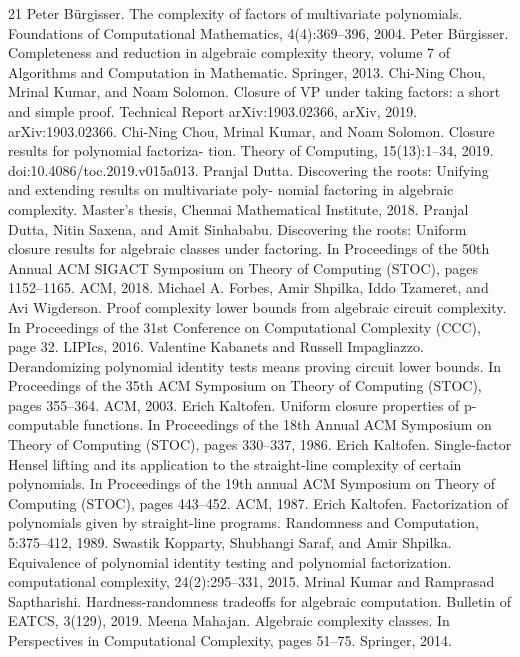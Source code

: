 \begin{thebibliography}{21}
Peter Bürgisser. The complexity of factors of multivariate polynomials. Foundations of Computational Mathematics, 4(4):369–396, 2004.
Peter Bürgisser. Completeness and reduction in algebraic complexity theory, volume 7 of Algorithms and Computation in Mathematic. Springer, 2013.
Chi-Ning Chou, Mrinal Kumar, and Noam Solomon. Closure of VP under taking factors: a short and simple proof. Technical Report arXiv:1903.02366, arXiv, 2019. arXiv:1903.02366.
Chi-Ning Chou, Mrinal Kumar, and Noam Solomon. Closure results for polynomial factoriza- tion. Theory of Computing, 15(13):1–34, 2019. doi:10.4086/toc.2019.v015a013.
Pranjal Dutta. Discovering the roots: Unifying and extending results on multivariate poly- nomial factoring in algebraic complexity. Master’s thesis, Chennai Mathematical Institute, 2018.
Pranjal Dutta, Nitin Saxena, and Amit Sinhababu. Discovering the roots: Uniform closure results for algebraic classes under factoring. In Proceedings of the 50th Annual ACM SIGACT Symposium on Theory of Computing (STOC), pages 1152–1165. ACM, 2018.
Michael A. Forbes, Amir Shpilka, Iddo Tzameret, and Avi Wigderson. Proof complexity lower bounds from algebraic circuit complexity. In Proceedings of the 31st Conference on Computational Complexity (CCC), page 32. LIPIcs, 2016.
Valentine Kabanets and Russell Impagliazzo. Derandomizing polynomial identity tests means proving circuit lower bounds. In Proceedings of the 35th ACM Symposium on Theory of Computing (STOC), pages 355–364. ACM, 2003.
Erich Kaltofen. Uniform closure properties of p-computable functions. In Proceedings of the 18th Annual ACM Symposium on Theory of Computing (STOC), pages 330–337, 1986.
Erich Kaltofen. Single-factor Hensel lifting and its application to the straight-line complexity of certain polynomials. In Proceedings of the 19th annual ACM Symposium on Theory of Computing (STOC), pages 443–452. ACM, 1987.
Erich Kaltofen. Factorization of polynomials given by straight-line programs. Randomness and Computation, 5:375–412, 1989.
Swastik Kopparty, Shubhangi Saraf, and Amir Shpilka. Equivalence of polynomial identity testing and polynomial factorization. computational complexity, 24(2):295–331, 2015.
Mrinal Kumar and Ramprasad Saptharishi. Hardness-randomness tradeoffs for algebraic computation. Bulletin of EATCS, 3(129), 2019.
Meena Mahajan. Algebraic complexity classes. In Perspectives in Computational Complexity, pages 51–75. Springer, 2014.

\end{thebibliography}
